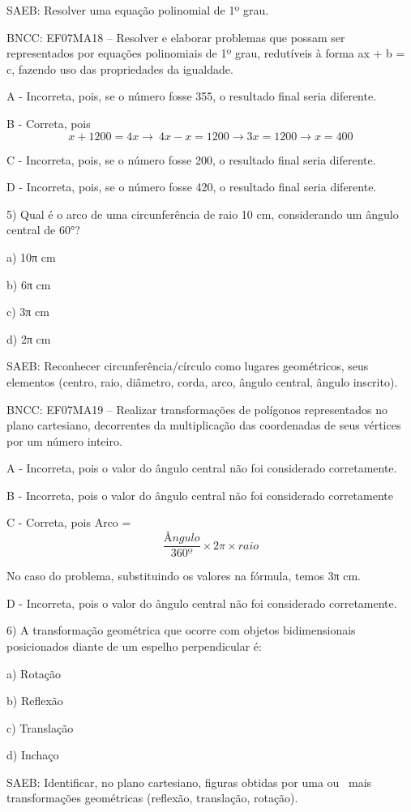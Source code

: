 SAEB: Resolver uma equação polinomial de 1º grau.

BNCC: EF07MA18 -- Resolver e elaborar problemas que possam ser
representados por equações polinomiais de 1º grau, redutíveis à forma ax
+ b = c, fazendo uso das propriedades da igualdade.

A - Incorreta, pois, se o número fosse 355, o resultado final seria
diferente.

B - Correta, pois
\[x + 1200 = 4x \rightarrow \ 4x - x = 1200 \rightarrow 3x = 1200 \rightarrow x = 400\]

C - Incorreta, pois, se o número fosse 200, o resultado final seria
diferente.

D - Incorreta, pois, se o número fosse 420, o resultado final seria
diferente.

5) Qual é o arco de uma circunferência de raio 10 cm, considerando um
ângulo central de 60°?

a) 10π cm

b) 6π cm

c) 3π cm

d) 2π cm

SAEB: Reconhecer circunferência/círculo como lugares geométricos, seus
elementos (centro, raio, diâmetro, corda, arco, ângulo central, ângulo
inscrito).

BNCC: EF07MA19 -- Realizar transformações de polígonos representados no
plano cartesiano, decorrentes da multiplicação das coordenadas de seus
vértices por um número inteiro.

A - Incorreta, pois o valor do ângulo central não foi considerado
corretamente.

B - Incorreta, pois o valor do ângulo central não foi considerado
corretamente

C - Correta, pois Arco = \[\frac {Ângulo}{360º} \times 2π \times raio\]

No caso do problema, substituindo os valores na fórmula, temos 3π cm.

D - Incorreta, pois o valor do ângulo central não foi considerado
corretamente.

6) A transformação geométrica que ocorre com objetos bidimensionais
posicionados diante de um espelho perpendicular é:

a) Rotação

b) Reflexão

c) Translação

d) Inchaço~

SAEB: Identificar, no plano cartesiano, figuras obtidas por uma ou~ mais
transformações geométricas (reflexão, translação, rotação).

